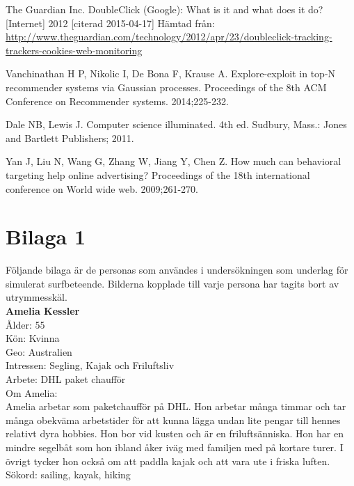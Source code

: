 \documentclass[a4paper,11pt]{article}
\begin{document}
{\begin{thebibliography}{888}
The Guardian Inc. DoubleClick (Google): What is it and what does it do? [Internet] 2012 [citerad 2015-04-17] Hämtad från: \url{http://www.theguardian.com/technology/2012/apr/23/doubleclick-tracking-trackers-cookies-web-monitoring}

Vanchinathan H P, Nikolic I, De Bona F, Krause A. Explore-exploit in top-N recommender systems via Gaussian processes. Proceedings of the 8th ACM Conference on Recommender systems. 2014;225-232.

 Dale NB, Lewis J. Computer science illuminated. 4th ed. Sudbury, Mass.: Jones and Bartlett Publishers; 2011.

Yan J, Liu N, Wang G, Zhang W, Jiang Y, Chen Z. How much can behavioral targeting help online advertising? Proceedings of the 18th international conference on World wide web. 2009;261-270. 

\newpage

\section*{Bilaga 1}
Följande bilaga är de personas som användes i undersökningen som underlag för simulerat surfbeteende. Bilderna kopplade till varje persona har tagits bort av utrymmesskäl. \\

\textbf{Amelia Kessler}\\
Ålder: 55\\
Kön: Kvinna\\
Geo: Australien\\
Intressen: Segling, Kajak och Friluftsliv \\
Arbete: DHL paket chaufför \\
Om Amelia:\\

Amelia arbetar som paketchaufför på DHL. Hon arbetar många timmar och tar många obekväma arbetstider för att kunna lägga undan lite pengar till hennes relativt dyra hobbies. Hon bor vid kusten och är en friluftsänniska. Hon har en mindre segelbåt som hon ibland åker iväg med familjen med på kortare turer. I övrigt tycker hon också om att paddla kajak och att vara ute i friska luften. \\

Sökord: sailing, kayak, hiking\\\\



\end{thebibliography}}
\end{document}
